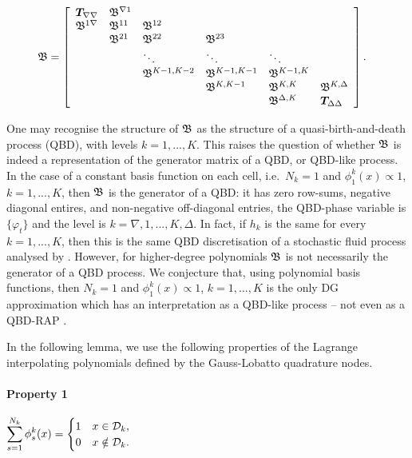 \begin{align*}
{  {\mathfrak{\boldsymbol B}}} &= \left[\begin{array}{llllll}
	\boldsymbol T_{\nabla\nabla}&  {  {\mathfrak{\boldsymbol B}}}^{\nabla1} & & & & \\
	 {  {\mathfrak{\boldsymbol B}}}^{1\nabla} &  {  {\mathfrak{\boldsymbol B}}}^{11} &  {  {\mathfrak{\boldsymbol B}}}^{12} & & & \\
	&  {  {\mathfrak{\boldsymbol B}}}^{21} &  {  {\mathfrak{\boldsymbol B}}}^{22} &  {  {\mathfrak{\boldsymbol B}}}^{23} & & \\
	& & \ddots & \ddots & \ddots & \\
	& &  {   {\mathfrak{\boldsymbol B}}}^{K-1,K-2} & {   {\mathfrak{\boldsymbol B}}}^{K-1,K-1} &  {  {\mathfrak{\boldsymbol B}}}^{K-1,K} & \\
	& & & {   {\mathfrak{\boldsymbol B}}}^{K,K-1} &  {  {\mathfrak{\boldsymbol B}}}^{K,K} &  {  {\mathfrak{\boldsymbol B}}}^{K,\Delta} \\
	& & & &  {  {\mathfrak{\boldsymbol B}}}^{\Delta, K} & \boldsymbol T_{\Delta\Delta}
\end{array}\right].\end{align*}

	\begin{rem}
	One may recognise the structure of \( {  {\mathfrak{\boldsymbol B}}}\) as the structure of a quasi-birth-and-death process (QBD), with levels \(k=1,...,K\). This raises the question of whether \( {  {\mathfrak{\boldsymbol B}}}\) is indeed a representation of the generator matrix of a QBD, or QBD-like process. In the case of a constant basis function on each cell, i.e.~\(N_k=1\) and \(\phi_1^k(x)\propto1\), \(k=1,...,K\), then \( {  {\mathfrak{\boldsymbol B}}}\) is the generator of a QBD: it has zero row-sums, negative diagonal entires, and non-negative off-diagonal entries, the QBD-phase variable is \(\{\varphi_t\}\) and the level is \(k=\nabla,1,...,K,\Delta\). In fact, if \(h_k\) is the same for every \(k=1,...,K\), then this is the same QBD discretisation of a stochastic fluid process analysed by \cite{bo2013}. However, for higher-degree polynomials \(\mathfrak{\boldsymbol B}\) is not necessarily the generator of a QBD process. We conjecture that, using polynomial basis functions, then \(N_k=1\) and \(\phi_1^k(x)\propto1\), \(k=1,...,K\) is the only DG approximation which has an interpretation as a QBD-like process -- not even as a QBD-RAP \citep{bn2010}.
	\end{rem}
	
	In the following lemma, we use the following properties of the Lagrange interpolating polynomials defined by the Gauss-Lobatto quadrature nodes. 
	\paragraph{Property 1} \(\displaystyle\sum_{s=1}^{N_k} \phi_s^k(x) = \begin{cases} 1&x\in\mathcal{D}_k,\\ 0 & x\notin \mathcal{D}_k.\end{cases}\)

